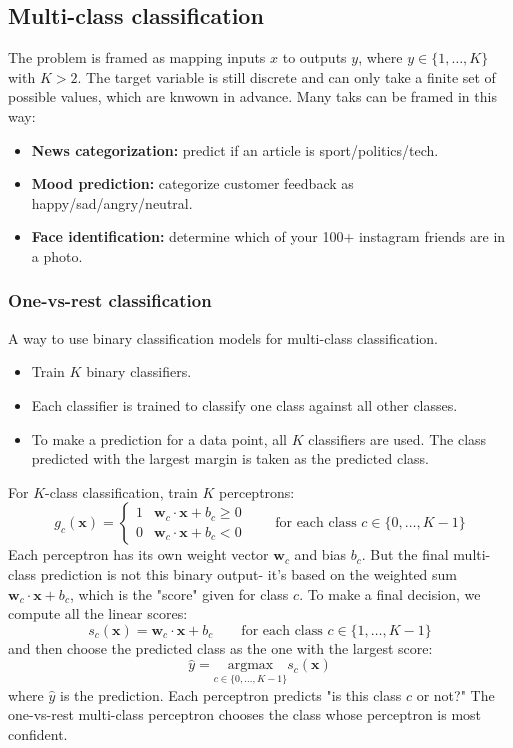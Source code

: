 \documentclass[11pt]{article}
\begin{document}
\subsection{Multi-class classification}
The problem is framed as mapping inputs $x$ to outputs $y$, where $y\in\{1,\dots, K\}$ with $K>2$. The target variable is still discrete and can only take a finite set of possible values, which are knwown in advance.
Many taks can be framed in this way:
\begin{itemize}
    \item \textbf{News categorization:} predict if an article is sport/politics/tech.
    \item \textbf{Mood prediction:} categorize customer feedback as happy/sad/angry/neutral.
    \item \textbf{Face identification:} determine which of your 100+ instagram friends are in a photo.
\end{itemize}
\subsubsection{One-vs-rest classification}
A way to use binary classification models for multi-class classification.
\begin{itemize}
    \item Train $K$ binary classifiers.
    \item Each classifier is trained to classify one class against all other classes.
    \item To make a prediction for a data point, all $K$ classifiers are used. The class predicted with the largest margin is taken as the predicted class.
\end{itemize}
For $K$-class classification, train $K$ perceptrons:
$$
g_c(\mathbf{x})=\begin{cases}
    1 & \mathbf{w}_c\cdot \mathbf{x}+b_c\ge 0 \\
    0 & \mathbf{w}_c\cdot \mathbf{x}+b_c < 0
\end{cases}
\quad\quad
\text{for each class }c\in\{0,\dots,K-1\}
$$
Each perceptron has its own weight vector $\mathbf{w}_c$ and bias $b_c$. But the final multi-class prediction is not this binary output- it's based on the weighted sum $\mathbf{w}_c\cdot\mathbf{x}+b_c$, which is the "score" given for class $c$.
To make a final decision, we compute all the linear scores:
$$
s_c(\mathbf{x})=\mathbf{w}_c\cdot\mathbf{x}+b_c\quad\quad\text{for each class }c\in\{1,\dots,K-1\}
$$
and then choose the predicted class as the one with the largest score:
$$
\hat{y}=\underset{c\in\{0,\dots,K-1\}}{\text{argmax}}s_c(\mathbf{x})
$$
where $\hat{y}$ is the prediction. Each perceptron predicts "is this class $c$ or not?" The one-vs-rest multi-class perceptron chooses the class whose perceptron is most confident.
\end{document}
